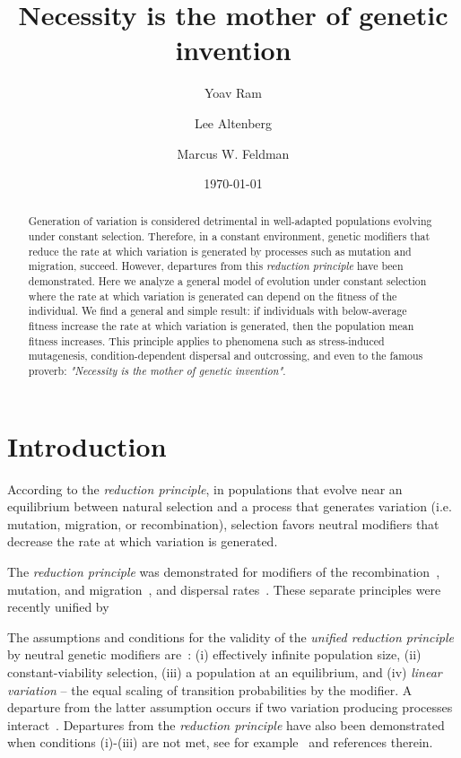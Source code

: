 \documentclass[9pt, a4paper, twocolumn]{extarticle}   	%
\title{Necessity is the mother of genetic invention}
\author[a]{Yoav Ram}
\author[b]{Lee Altenberg}
\author[a]{Marcus W. Feldman}
\affil[a]{Department of Biology, Stanford University, Stanford, CA}
\affil[b]{Information and Computer Sciences, University of Hawai`i at M{\=a}noa, Honolulu, HI}
\date{\today} %
\begin{document}
\maketitle

\begin{abstract}
Generation of variation is considered detrimental in well-adapted populations evolving under constant selection.
Therefore, in a constant environment, genetic modifiers that reduce the rate at which variation is generated by processes such as mutation and migration, succeed.
However, departures from this \emph{reduction principle} have been demonstrated.
Here we analyze a general model of evolution under constant selection where the rate at which variation is generated can depend on the fitness of the individual.
We find a general and simple result:
if individuals with below-average fitness increase the rate at which variation is generated, then the population mean fitness increases.
This principle applies to phenomena such as stress-induced mutagenesis, condition-dependent dispersal and outcrossing,
and even to the famous proverb: \emph{"Necessity is the mother of genetic invention"}.
\end{abstract}

\section*{Introduction}

According to the \emph{reduction principle}, in populations that evolve near an equilibrium between natural selection and a process that generates variation (i.e. mutation, migration, or recombination), selection favors neutral modifiers that decrease the rate at which variation is generated. 

The \emph{reduction principle} was demonstrated for modifiers of the recombination~\citep{Feldman1972}, mutation, and migration~\citep{Liberman1986a}, and dispersal rates~\citep{Altenberg1987}.
These separate principles were recently unified by~\citet{Altenberg2017}

The assumptions and conditions for the validity of the \emph{unified reduction principle} by neutral genetic modifiers are~\citep{Altenberg2017}:
(i) effectively infinite population size, (ii) constant-viability selection, (iii) a population at an equilibrium, and (iv) \emph{linear variation} -- the equal scaling of transition probabilities by the modifier.
A departure from the latter assumption occurs if two variation producing processes interact~\citep{Feldman1980,Altenberg2012}.
Departures from the \emph{reduction principle} have also been demonstrated when conditions (i)-(iii) are not met, see for example~\citet{Holsinger1986} and references therein.
\end{document}
